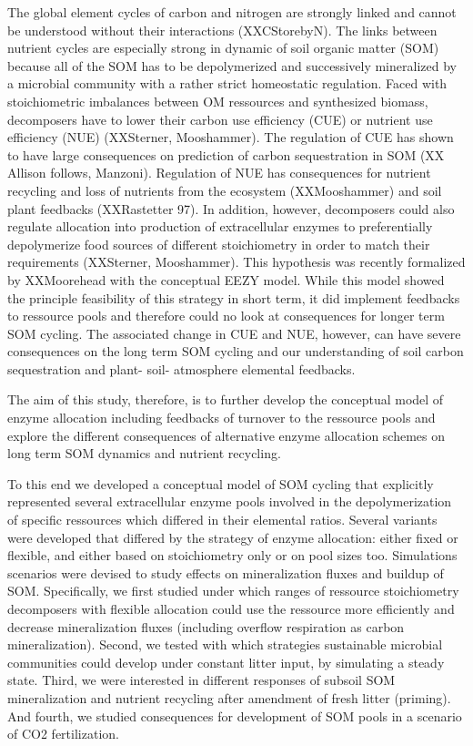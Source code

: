 \introduction  %
The global element cycles of carbon and nitrogen are strongly linked and cannot
be understood without their interactions (XXCStorebyN). The links between nutrient
cycles are especially strong in dynamic of soil organic matter (SOM) because all
of the SOM has to be depolymerized and successively mineralized by a microbial
community with a rather strict homeostatic regulation. Faced with stoichiometric
imbalances between OM ressources and synthesized biomass, decomposers have to
lower their carbon use efficiency (CUE) or nutrient use efficiency (NUE) 
(XXSterner, Mooshammer). The regulation of CUE has shown to have large
consequences on prediction of carbon sequestration in SOM (XX Allison follows,
Manzoni). Regulation of NUE has consequences for nutrient recycling and loss of
nutrients from the ecosystem (XXMooshammer) and soil plant feedbacks
(XXRastetter 97). In addition, however, decomposers could also regulate
allocation into production of extracellular enzymes to preferentially
depolymerize food sources of different stoichiometry in order to match their
requirements (XXSterner, Mooshammer). This hypothesis was recently formalized by
XXMoorehead with the conceptual EEZY model. While this model showed the
principle feasibility of this strategy in short term, it did implement feedbacks
to ressource pools and therefore could no look at consequences for longer term
SOM cycling. The associated change in CUE and NUE, however, can have severe
consequences on the long term SOM cycling and our understanding of soil carbon
sequestration and plant- soil- atmosphere elemental feedbacks.

The aim of this study, therefore, is to further develop the conceptual model of
enzyme allocation including feedbacks of turnover to the ressource pools and
explore the different consequences of alternative enzyme allocation schemes on
long term SOM dynamics and nutrient recycling.

To this end we developed a conceptual model of SOM cycling that explicitly
represented several extracellular enzyme pools involved in the depolymerization
of specific ressources which differed in their elemental ratios. Several
variants were developed that differed by the strategy of enzyme allocation:
either fixed or flexible, and either based on stoichiometry only or on pool
sizes too. Simulations scenarios were devised to study effects on mineralization
fluxes and buildup of SOM. Specifically, we first studied under which ranges of
ressource stoichiometry decomposers with flexible allocation could use the
ressource more efficiently and decrease mineralization fluxes (including
overflow respiration as carbon mineralization). Second, we tested with which
strategies sustainable microbial communities could develop under constant litter
input, by simulating a steady state. Third, we were interested in different
responses of subsoil SOM mineralization and nutrient recycling after amendment
of fresh litter (priming). And fourth, we studied consequences for development
of SOM pools in a scenario of CO2 fertilization.

